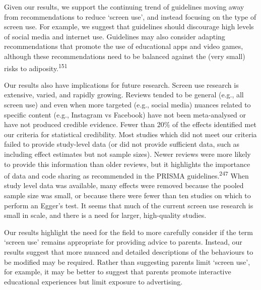 \documentclass[
  english,
  man]{apa6}
\begin{document}
Given our results, we support the continuing trend of guidelines moving away from recommendations to reduce `screen use', and instead focusing on the type of screen use.
For example, we suggest that guidelines should discourage high levels of social media and internet use.
Guidelines may also consider adapting recommendations that promote the use of educational apps and video games, although these recommendations need to be balanced against the (very small) risks to adiposity.\textsuperscript{151}

Our results also have implications for future research.
Screen use research is extensive, varied, and rapidly growing.
Reviews tended to be general (e.g., all screen use) and even when more targeted (e.g., social media) nuances related to specific content (e.g., Instagram vs Facebook) have not been meta-analysed or have not produced credible evidence.
Fewer than 20\% of the effects identified met our criteria for statistical credibility.
Most studies which did not meet our criteria failed to provide study-level data (or did not provide sufficient data, such as including effect estimates but not sample sizes).
Newer reviews were more likely to provide this information than older reviews, but it highlights the importance of data and code sharing as recommended in the PRISMA guidelines.\textsuperscript{247}
When study level data was available, many effects were removed because the pooled sample size was small, or because there were fewer than ten studies on which to perform an Egger's test.
It seems that much of the current screen use research is small in scale, and there is a need for larger, high-quality studies.

Our results highlight the need for the field to more carefully consider if the term `screen use' remains appropriate for providing advice to parents.
Instead, our results suggest that more nuanced and detailed descriptions of the behaviours to be modified may be required.
Rather than suggesting parents limit `screen use', for example, it may be better to suggest that parents promote interactive educational experiences but limit exposure to advertising.
\end{document}
